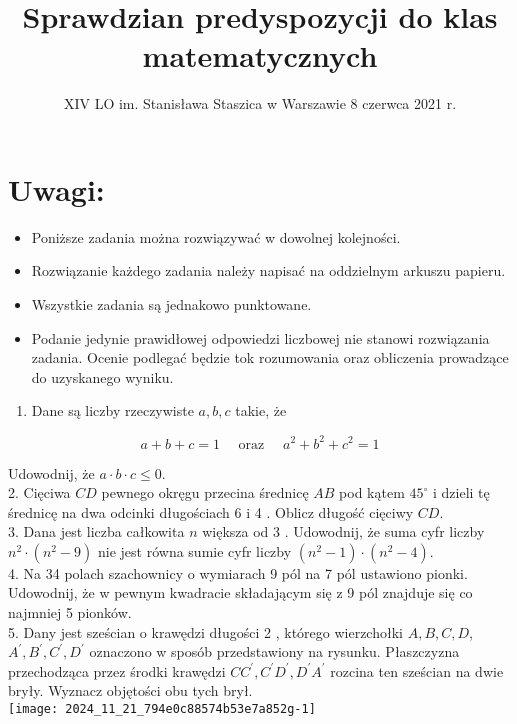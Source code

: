 \documentclass[10pt]{article}
\title{Sprawdzian predyspozycji do klas matematycznych }
\author{XIV LO im. Stanisława Staszica w Warszawie 8 czerwca 2021 r.}
\date{}
\begin{document}
\maketitle


\section*{Uwagi:}
\begin{itemize}
  \item Poniższe zadania można rozwiązywać w dowolnej kolejności.
  \item Rozwiązanie każdego zadania należy napisać na oddzielnym arkuszu papieru.
  \item Wszystkie zadania są jednakowo punktowane.
  \item Podanie jedynie prawidłowej odpowiedzi liczbowej nie stanowi rozwiązania zadania. Ocenie podlegać będzie tok rozumowania oraz obliczenia prowadzące do uzyskanego wyniku.
\end{itemize}

\begin{enumerate}
  \item Dane są liczby rzeczywiste \(a, b, c\) takie, że
\end{enumerate}

\[
a+b+c=1 \quad \text { oraz } \quad a^{2}+b^{2}+c^{2}=1
\]

Udowodnij, że \(a \cdot b \cdot c \leqslant 0\).\\
2. Cięciwa \(C D\) pewnego okręgu przecina średnicę \(A B\) pod kątem \(45^{\circ}\) i dzieli tę średnicę na dwa odcinki długościach 6 i 4 . Oblicz długość cięciwy \(C D\).\\
3. Dana jest liczba całkowita \(n\) większa od 3 . Udowodnij, że suma cyfr liczby \(n^{2} \cdot\left(n^{2}-9\right)\) nie jest równa sumie cyfr liczby \(\left(n^{2}-1\right) \cdot\left(n^{2}-4\right)\).\\
4. Na 34 polach szachownicy o wymiarach 9 pól na 7 pól ustawiono pionki. Udowodnij, że w pewnym kwadracie składającym się z 9 pól znajduje się co najmniej 5 pionków.\\
5. Dany jest sześcian o krawędzi długości 2 , którego wierzchołki \(A, B, C, D\), \(A^{\prime}, B^{\prime}, C^{\prime}, D^{\prime}\) oznaczono w sposób przedstawiony na rysunku. Płaszczyzna przechodząca przez środki krawędzi \(C C^{\prime}, C^{\prime} D^{\prime}, D^{\prime} A^{\prime}\) rozcina ten sześcian na dwie bryły. Wyznacz objętości obu tych brył.\\
\texttt{[image: 2024\_11\_21\_794e0c88574b53e7a852g-1]}
\end{document}
